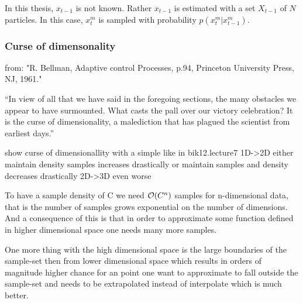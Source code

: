 In this thesis, $x_{t-1}$ is not known. Rather $x_{t-1}$ is estimated with a set $X_{t-1}$ of $N$ particles. In this case, $x_t^m$ is sampled with probability $p\left(x_t^m | x_{t-1}^m\right)$.



\subsubsection{Curse of dimensonality}




from:
"R. Bellman, Adaptive control Processes, p.94, Princeton University Press, NJ,
1961."

“In view of all that we have said in the foregoing
sections, the many obstacles we appear to have
surmounted. What casts the pall over our victory
celebration? It is the curse of dimensionality, a
malediction that has plagued the scientist from
earliest days.”


show curse of dimensionallity with a simple like in bik12.lecture7
1D->2D
either maintain density samples increases drastically
or maintain samples and density decreases drastically
2D->3D
even worse

To have a sample density of C we need $\mathcal{O}{\left(C^n\right)}$ samples for n-dimensional data,
that is the number of samples grows exponential on the number of dimensions.
And a consequence of this is that in order to approximate some
function defined in higher dimensional space one needs many more samples.

One more thing with the high dimensional space is the large boundaries 
of the sample-set then from lower dimensional space which results in orders of
magnitude higher chance for an point one want to approximate to fall outside
the sample-set and needs to be extrapolated instead of interpolate which is
much better.

